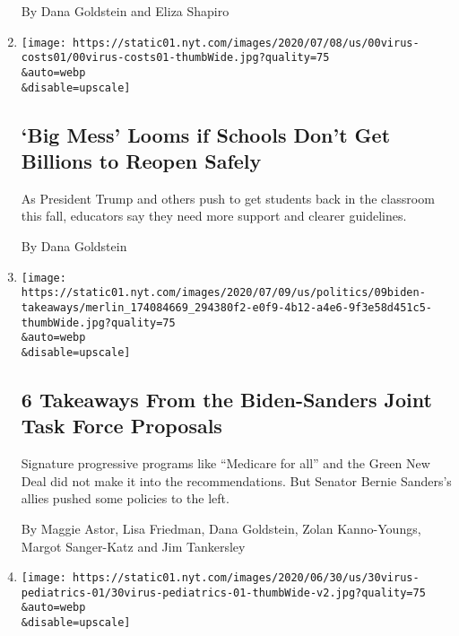 \begin{enumerate}
  By Dana Goldstein and Eliza Shapiro
\item
  \href{/2020/07/09/us/schools-reopening-trump.html}{}

  \texttt{[image: https://static01.nyt.com/images/2020/07/08/us/00virus-costs01/00virus-costs01-thumbWide.jpg?quality=75\\\&auto=webp\\\&disable=upscale]}

  \hypertarget{big-mess-looms-if-schools-dont-get-billions-to-reopen-safely}{%
  \subsection{`Big Mess' Looms if Schools Don't Get Billions to Reopen
  Safely}\label{big-mess-looms-if-schools-dont-get-billions-to-reopen-safely}}

  As President Trump and others push to get students back in the
  classroom this fall, educators say they need more support and clearer
  guidelines.

  By Dana Goldstein
\item
  \href{/2020/07/09/us/politics/biden-sanders-task-force.html}{}

  \texttt{[image: https://static01.nyt.com/images/2020/07/09/us/politics/09biden-takeaways/merlin\_174084669\_294380f2-e0f9-4b12-a4e6-9f3e58d451c5-thumbWide.jpg?quality=75\\\&auto=webp\\\&disable=upscale]}

  \hypertarget{6-takeaways-from-the-biden-sanders-joint-task-force-proposals}{%
  \subsection{6 Takeaways From the Biden-Sanders Joint Task Force
  Proposals}\label{6-takeaways-from-the-biden-sanders-joint-task-force-proposals}}

  Signature progressive programs like ``Medicare for all'' and the Green
  New Deal did not make it into the recommendations. But Senator Bernie
  Sanders's allies pushed some policies to the left.

  By Maggie Astor, Lisa Friedman, Dana Goldstein, Zolan Kanno-Youngs,
  Margot Sanger-Katz and Jim Tankersley
\item
  \href{/2020/06/30/us/coronavirus-schools-reopening-guidelines-aap.html}{}

  \texttt{[image: https://static01.nyt.com/images/2020/06/30/us/30virus-pediatrics-01/30virus-pediatrics-01-thumbWide-v2.jpg?quality=75\\\&auto=webp\\\&disable=upscale]}

  \hypertarget{why-a-pediatric-group-is-pushing-to-reopen-schools-this-fall}{%
}
\end{enumerate}
